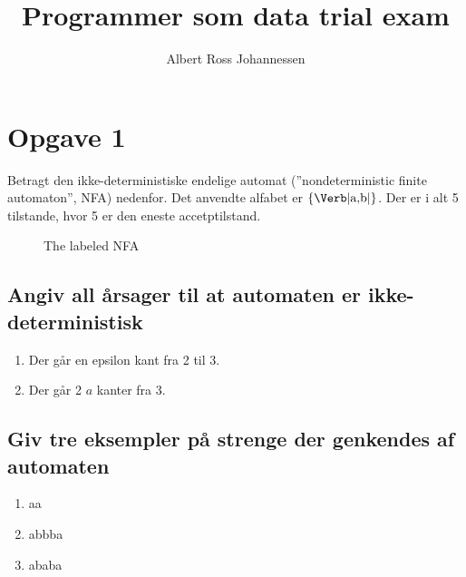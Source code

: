 \documentclass[11pt,a4paper]{article}
\begin{document}
\begin{titlepage}
  \title{Programmer som data trial exam}
  \author{Albert Ross Johannessen}
  \maketitle
  \newpage
  \thispagestyle{empty}
  \newpage
\end{titlepage}

\pagestyle{fancy}
\fancyhf{}
\newpage
\section{Opgave 1}
Betragt den ikke-deterministiske endelige automat (''nondeterministic finite automaton'', NFA) nedenfor. Det anvendte alfabet er $\{\text{\Verb|a,b|}\}$. Der er i alt 5 tilstande, hvor 5 er den eneste accetptilstand.
\begin{figure}[!ht]\label{fig:examfignfa}
  \centering
  \caption{The labeled NFA}
\end{figure}
\subsection{Angiv all årsager til at automaten er ikke-deterministisk}
\begin{enumerate}
  \item Der går en epsilon kant fra 2 til 3.
  \item Der går 2 $a$ kanter fra 3.
\end{enumerate}
\subsection{Giv tre eksempler på strenge der genkendes af automaten}
\begin{enumerate}
  \item aa
  \item abbba
  \item ababa
\end{enumerate}
\end{document}

